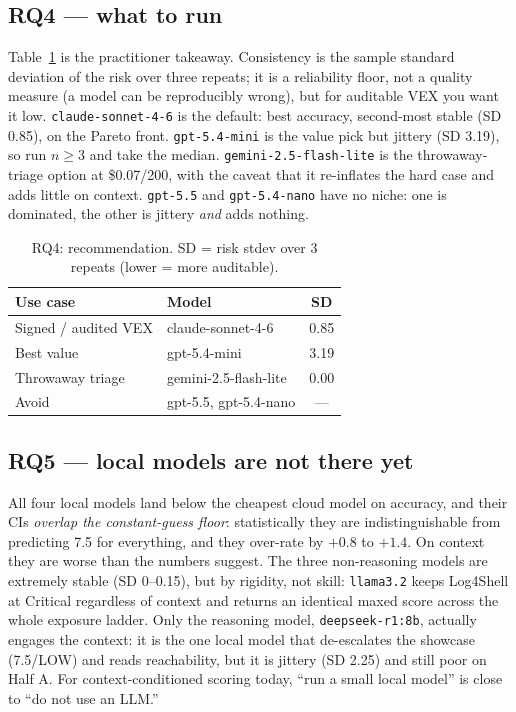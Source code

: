 \documentclass[10pt,twocolumn]{article}
\newcommand{\code}[1]{\texttt{\small #1}}
\begin{document}
\subsection{RQ4 --- what to run}
Table~\ref{tab:reco} is the practitioner takeaway. Consistency is the sample
standard deviation of the risk over three repeats; it is a reliability floor, not
a quality measure (a model can be reproducibly wrong), but for auditable VEX you
want it low. \code{claude-sonnet-4-6} is the default: best accuracy, second-most
stable (SD 0.85), on the Pareto front. \code{gpt-5.4-mini} is the value pick but
jittery (SD 3.19), so run $n\ge3$ and take the median. \code{gemini-2.5-flash-lite}
is the throwaway-triage option at \$0.07/200, with the caveat that it re-inflates
the hard case and adds little on context. \code{gpt-5.5} and \code{gpt-5.4-nano}
have no niche: one is dominated, the other is jittery \emph{and} adds nothing.

\begin{table}[t]\centering\small
\caption{RQ4: recommendation. SD = risk stdev over 3 repeats (lower = more auditable).}
\label{tab:reco}
\begin{tabular}{@{}llc@{}}
\toprule
Use case & Model & SD \\
\midrule
Signed / audited VEX & claude-sonnet-4-6 & 0.85 \\
Best value           & gpt-5.4-mini      & 3.19 \\
Throwaway triage     & gemini-2.5-flash-lite & 0.00 \\
Avoid                & gpt-5.5, gpt-5.4-nano & --- \\
\bottomrule
\end{tabular}
\end{table}

\subsection{RQ5 --- local models are not there yet}
All four local models land below the cheapest cloud model on accuracy, and their
CIs \emph{overlap the constant-guess floor}: statistically they are
indistinguishable from predicting 7.5 for everything, and they over-rate by
$+0.8$ to $+1.4$. On context they are worse than the numbers suggest. The three
non-reasoning models are extremely stable (SD 0--0.15), but by rigidity, not
skill: \code{llama3.2} keeps Log4Shell at Critical regardless of context and
returns an identical maxed score across the whole exposure ladder. Only the
reasoning model, \code{deepseek-r1:8b}, actually engages the context: it is the
one local model that de-escalates the showcase (7.5/LOW) and reads
reachability, but it is jittery (SD 2.25) and still poor on Half A. For
context-conditioned scoring today, ``run a small local model'' is close to ``do
not use an LLM.''
\end{document}
